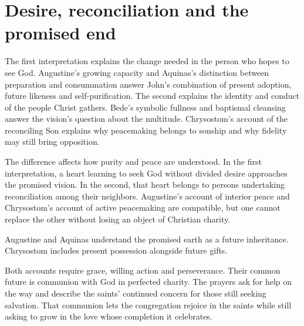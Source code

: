 \section{Desire, reconciliation and the promised end}
The first interpretation explains the change needed in the person who hopes to see God. Augustine's growing capacity and Aquinas's distinction between preparation and consummation answer John's combination of present adoption, future likeness and self-purification. The second explains the identity and conduct of the people Christ gathers. Bede's symbolic fullness and baptismal cleansing answer the vision's question about the multitude. Chrysostom's account of the reconciling Son explains why peacemaking belongs to sonship and why fidelity may still bring opposition.

The difference affects how purity and peace are understood. In the first interpretation, a heart learning to seek God without divided desire approaches the promised vision. In the second, that heart belongs to persons undertaking reconciliation among their neighbors. Augustine's account of interior peace and Chrysostom's account of active peacemaking are compatible, but one cannot replace the other without losing an object of Christian charity.

Augustine and Aquinas understand the promised earth as a future inheritance. Chrysostom includes present possession alongside future gifts.

Both accounts require grace, willing action and perseverance. Their common future is communion with God in perfected charity. The prayers ask for help on the way and describe the saints' continued concern for those still seeking salvation. That communion lets the congregation rejoice in the saints while still asking to grow in the love whose completion it celebrates.
